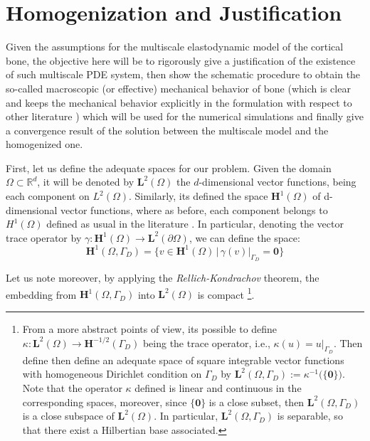 \chapter{Homogenization and Justification}

Given the assumptions for the multiscale elastodynamic model of the cortical bone, the objective here will be to rigorously give a justification of the existence of such multiscale PDE system, then show the schematic procedure to obtain the so-called macroscopic (or effective) mechanical behavior of bone (which is clear and keeps the mechanical behavior explicitly in the formulation with respect to other literature \cite{Parnell2008}) which will be used for the numerical simulations and finally give a convergence result of the solution between the multiscale model and the homogenized one.

First, let us define the adequate spaces for our problem. Given the domain $\Omega \subset \mathbb{R}^d$, it will be denoted by $\mathbf{L}^2(\Omega)$ the $d$-dimensional vector functions, being each component on $L^2(\Omega)$. Similarly, its defined the space $\mathbf{H}^1(\Omega)$ of d-dimensional vector functions, where as before, each component belongs to $H^1(\Omega)$ defined as usual in the literature \cite{evans2010partial}. 
In particular, denoting the vector trace operator by $\gamma: \mathbf{H}^1(\Omega) \rightarrow \mathbf{L}^2(\partial \Omega)$, we can define the space:
\begin{equation*}
    \mathbf{H}^1(\Omega, \Gamma_D) = \big \{ v \in \mathbf{H}^1(\Omega) \, \vert \, \gamma (v) \vert_{\Gamma_D} = \mathbf{0} \big \}
\end{equation*}

Let us note moreover, by applying the \textit{Rellich-Kondrachov} theorem, the embedding from $\mathbf{H}^1(\Omega, \Gamma_D)$ into $\mathbf{L}^2(\Omega)$ is compact \footnote{From a more abstract points of view, its possible to define $\kappa: \mathbf{L}^2( \Omega) \longrightarrow \mathbf{H}^{-1/2}(\Gamma_D)$ being the trace operator, i.e., $\kappa (u) = u \vert_{\Gamma_D}$. Then define then define an adequate space of square integrable vector functions with homogeneous Dirichlet condition on $\Gamma_D$ by $\mathbf{L}^2(\Omega, \Gamma_D) := \kappa^{-1}\big( \{ \mathbf{0}\}\big)$. Note that the operator $\kappa$ defined is linear and continuous in the corresponding spaces, moreover, since $\{\mathbf{0}\}$ is a close subset, then $\mathbf{L}^2(\Omega, \Gamma_D)$ is a close subspace of $\mathbf{L}^2(\Omega)$.
In particular, $\mathbf{L}^2(\Omega, \Gamma_D)$ is separable, so that there exist a Hilbertian base associated.}.


